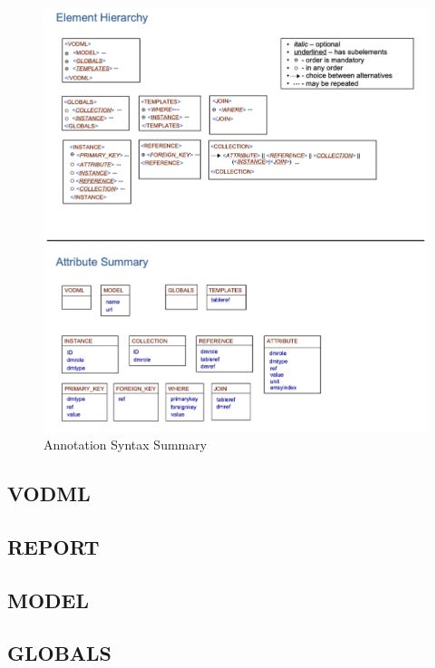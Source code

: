 \documentclass[11pt,a4paper]{ivoa}
\begin{document}
  \begin{figure}[h]
    \begin{center}
      \includegraphics[width=\textwidth]{merged-syntax-summary.png}
      \caption{Annotation Syntax Summary}
      \label{fig:summary}
    \end{center}
  \end{figure}

\pagebreak
\subsection{VODML}

\FloatBarrier

\subsection{REPORT}

\FloatBarrier
 
\subsection{MODEL}

\FloatBarrier

\subsection{GLOBALS}

\FloatBarrier
\end{document}
